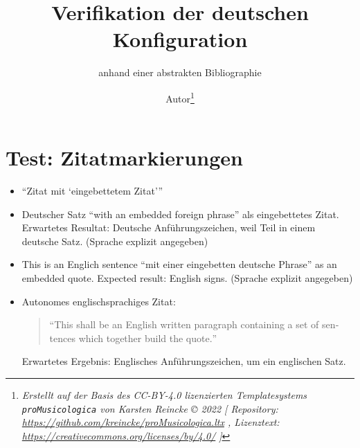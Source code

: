 \documentclass[
  DIV=calc,i
  BCOR=5mm,
  11pt,
  headings=small,
  oneside,
  abstract=true,
  toc=bib,
  english,ngerman]{scrartcl}
\begin{document}
\nocite{*}

\titlehead{Bib\LaTeX}
\subject{Release 1.0}
\title{Verifikation der deutschen Konfiguration}
\subtitle{anhand einer abstrakten Bibliographie}
\author{Autor\footnote{
\textit{Erstellt auf der Basis des CC-BY-4.0 lizenzierten Templatesystems \texttt{proMusicologica} von Karsten Reincke \copyright{} 2022 [
Repository: \href{https://github.com/kreincke/proMusicologica.ltx}{https://github.com/kreincke/proMusicologica.ltx} ,
Lizenztext: \href{https://creativecommons.org/licenses/by/4.0/}{https://creativecommons.org/licenses/by/4.0/} ]}}
}


\maketitle

\footnotesize
\tableofcontents

\normalsize
\section{Test: Zitatmarkierungen}
\begin{itemize}

  \item \enquote{Zitat mit \enquote{eingebettetem Zitat}}

  \item Deutscher Satz \foreignquote{german}{with an embedded foreign phrase} als eingebettetes Zitat. Erwartetes Resultat: Deutsche Anführungszeichen, weil Teil in einem deutsche Satz. (Sprache explizit angegeben)

  \item This is an Englich sentence \foreignquote{english}{mit einer eingebetten deutsche Phrase} as an embedded quote. Expected result: English signs. (Sprache explizit angegeben)

  \item Autonomes englischsprachiges Zitat:
  \begin{quote}\foreignquote{english}{This shall be an English written paragraph containing a set of sentences which together build the quote.}\end{quote}

  Erwartetes Ergebnis: Englisches Anführungszeichen, um ein englischen Satz.
\end{itemize}
\end{document}
